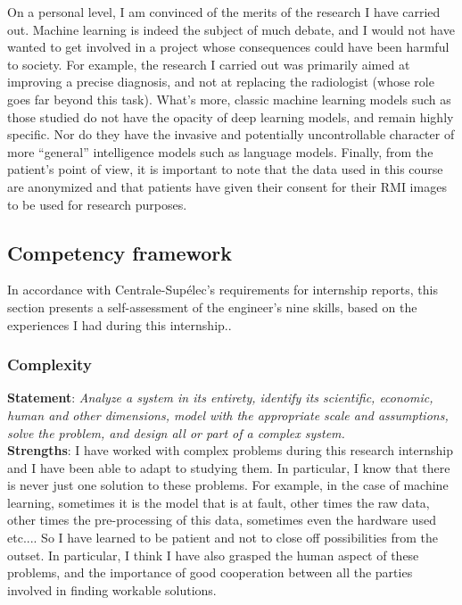 \documentclass[preprint,12pt]{elsarticle}
\begin{document}
\indent On a personal level, I am convinced of the merits of the research I have carried out. Machine learning is indeed the subject of much debate, and I would not have wanted to get involved in a project whose consequences could have been harmful to society. For example, the research I carried out was primarily aimed at improving a precise diagnosis, and not at replacing the radiologist (whose role goes far beyond this task). What's more, classic machine learning models such as those studied do not have the opacity of deep learning models, and remain highly specific. Nor do they have the invasive and potentially uncontrollable character of more “general” intelligence models such as language models. Finally, from the patient's point of view, it is important to note that the data used in this course are anonymized and that patients have given their consent for their RMI images to be used for research purposes.

\subsection{Competency framework}

\noindent In accordance with Centrale-Supélec's requirements for internship reports, this section presents a self-assessment of the engineer's nine skills, based on the experiences I had during this internship..\\

\subsubsection{Complexity}
\noindent \textbf{Statement}: \textit{ Analyze a system in its entirety, identify its scientific, economic, human and other dimensions, model with the appropriate scale and assumptions, solve the problem, and design all or part of a complex system.}\\[3 pt]

\noindent \textbf{Strengths}: I have worked with complex problems during this research internship and I have been able to adapt to studying them. In particular, I know that there is never just one solution to these problems. For example, in the case of machine learning, sometimes it is the model that is at fault, other times the raw data, other times the pre-processing of this data, sometimes even the hardware used etc.... So I have learned to be patient and not to close off possibilities from the outset. In particular, I think I have also grasped the human aspect of these problems, and the importance of good cooperation between all the parties involved in finding workable solutions.\\[3 pt] 
\end{document}
